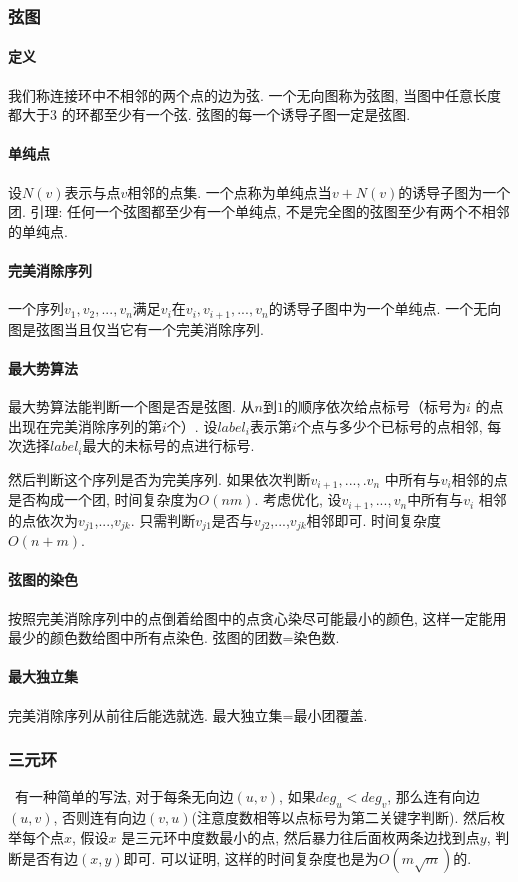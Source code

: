 \subsubsection{弦图}
				\paragraph{定义}我们称连接环中不相邻的两个点的边为弦. 一个无向图称为弦图, 当图中任意长度都大于$3$ 的环都至少有一个弦. 弦图的每一个诱导子图一定是弦图. 
				\paragraph{单纯点}设$N(v)$表示与点$v$相邻的点集. 一个点称为单纯点当${v}+N(v)$的诱导子图为一个团. 引理: 任何一个弦图都至少有一个单纯点, 不是完全图的弦图至少有两个不相邻的单纯点. 
				\paragraph{完美消除序列}一个序列${v_1,v_2,...,v_n}$满足$v_i$在${v_i,v_{i+1},...,v_n}$的诱导子图中为一个单纯点. 一个无向图是弦图当且仅当它有一个完美消除序列. 
				\paragraph{最大势算法}最大势算法能判断一个图是否是弦图. 从$n$到$1$的顺序依次给点标号（标号为$i$ 的点出现在完美消除序列的第$i$个）. 设$label_i$表示第$i$个点与多少个已标号的点相邻, 每次选择$label_i$最大的未标号的点进行标号. 
				\par 然后判断这个序列是否为完美序列. 如果依次判断${v_{i+1},...,.v_n}$ 中所有与$v_i$相邻的点是否构成一个团, 时间复杂度为$O(nm)$. 考虑优化, 设${v_{i+1},...,v_n}$中所有与$v_i$ 相邻的点依次为$v_{j1}$,...,$v_{jk}$.  只需判断$v_{j1}$是否与$v_{j2}$,...,$v_{jk}$相邻即可. 时间复杂度$O(n+m)$. 
				\paragraph{弦图的染色}按照完美消除序列中的点倒着给图中的点贪心染尽可能最小的颜色, 这样一定能用最少的颜色数给图中所有点染色. 弦图的团数=染色数. 
                \paragraph{最大独立集}完美消除序列从前往后能选就选. 最大独立集=最小团覆盖. 

\subsubsection{三元环}\
                有一种简单的写法, 对于每条无向边$(u,v)$, 如果$deg_u<deg_v$, 那么连有向边$(u,v)$, 否则连有向边$(v,u)$(注意度数相等以点标号为第二关键字判断). 然后枚举每个点$x$, 假设$x$ 是三元环中度数最小的点, 然后暴力往后面枚两条边找到点$y$, 判断是否有边$(x,y)$即可. 可以证明, 这样的时间复杂度也是为$O(m\sqrt{m})$的. 

